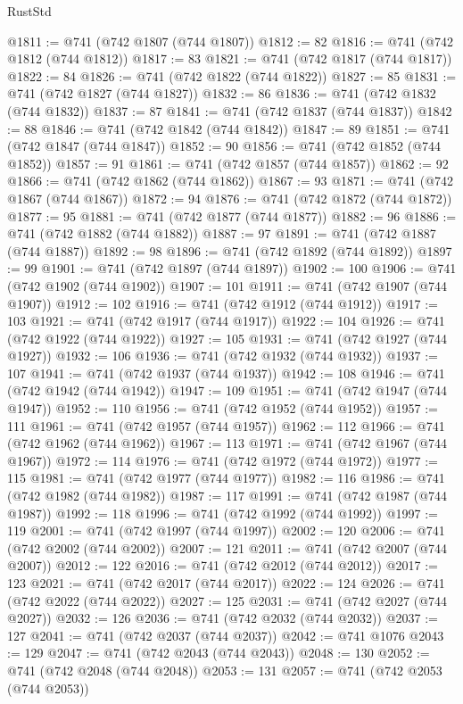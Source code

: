 \begin{lexlean}{RustStd}
\begin{coremodule}
@1811 := @741 (@742 @1807 (@744 @1807))
@1812 := 82
@1816 := @741 (@742 @1812 (@744 @1812))
@1817 := 83
@1821 := @741 (@742 @1817 (@744 @1817))
@1822 := 84
@1826 := @741 (@742 @1822 (@744 @1822))
@1827 := 85
@1831 := @741 (@742 @1827 (@744 @1827))
@1832 := 86
@1836 := @741 (@742 @1832 (@744 @1832))
@1837 := 87
@1841 := @741 (@742 @1837 (@744 @1837))
@1842 := 88
@1846 := @741 (@742 @1842 (@744 @1842))
@1847 := 89
@1851 := @741 (@742 @1847 (@744 @1847))
@1852 := 90
@1856 := @741 (@742 @1852 (@744 @1852))
@1857 := 91
@1861 := @741 (@742 @1857 (@744 @1857))
@1862 := 92
@1866 := @741 (@742 @1862 (@744 @1862))
@1867 := 93
@1871 := @741 (@742 @1867 (@744 @1867))
@1872 := 94
@1876 := @741 (@742 @1872 (@744 @1872))
@1877 := 95
@1881 := @741 (@742 @1877 (@744 @1877))
@1882 := 96
@1886 := @741 (@742 @1882 (@744 @1882))
@1887 := 97
@1891 := @741 (@742 @1887 (@744 @1887))
@1892 := 98
@1896 := @741 (@742 @1892 (@744 @1892))
@1897 := 99
@1901 := @741 (@742 @1897 (@744 @1897))
@1902 := 100
@1906 := @741 (@742 @1902 (@744 @1902))
@1907 := 101
@1911 := @741 (@742 @1907 (@744 @1907))
@1912 := 102
@1916 := @741 (@742 @1912 (@744 @1912))
@1917 := 103
@1921 := @741 (@742 @1917 (@744 @1917))
@1922 := 104
@1926 := @741 (@742 @1922 (@744 @1922))
@1927 := 105
@1931 := @741 (@742 @1927 (@744 @1927))
@1932 := 106
@1936 := @741 (@742 @1932 (@744 @1932))
@1937 := 107
@1941 := @741 (@742 @1937 (@744 @1937))
@1942 := 108
@1946 := @741 (@742 @1942 (@744 @1942))
@1947 := 109
@1951 := @741 (@742 @1947 (@744 @1947))
@1952 := 110
@1956 := @741 (@742 @1952 (@744 @1952))
@1957 := 111
@1961 := @741 (@742 @1957 (@744 @1957))
@1962 := 112
@1966 := @741 (@742 @1962 (@744 @1962))
@1967 := 113
@1971 := @741 (@742 @1967 (@744 @1967))
@1972 := 114
@1976 := @741 (@742 @1972 (@744 @1972))
@1977 := 115
@1981 := @741 (@742 @1977 (@744 @1977))
@1982 := 116
@1986 := @741 (@742 @1982 (@744 @1982))
@1987 := 117
@1991 := @741 (@742 @1987 (@744 @1987))
@1992 := 118
@1996 := @741 (@742 @1992 (@744 @1992))
@1997 := 119
@2001 := @741 (@742 @1997 (@744 @1997))
@2002 := 120
@2006 := @741 (@742 @2002 (@744 @2002))
@2007 := 121
@2011 := @741 (@742 @2007 (@744 @2007))
@2012 := 122
@2016 := @741 (@742 @2012 (@744 @2012))
@2017 := 123
@2021 := @741 (@742 @2017 (@744 @2017))
@2022 := 124
@2026 := @741 (@742 @2022 (@744 @2022))
@2027 := 125
@2031 := @741 (@742 @2027 (@744 @2027))
@2032 := 126
@2036 := @741 (@742 @2032 (@744 @2032))
@2037 := 127
@2041 := @741 (@742 @2037 (@744 @2037))
@2042 := @741 @1076
@2043 := 129
@2047 := @741 (@742 @2043 (@744 @2043))
@2048 := 130
@2052 := @741 (@742 @2048 (@744 @2048))
@2053 := 131
@2057 := @741 (@742 @2053 (@744 @2053))

\end{coremodule}
\end{lexlean}
